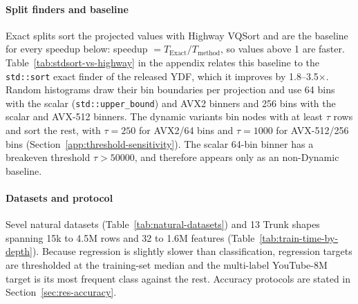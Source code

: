 \documentclass[sigconf]{acmart}%
\begin{document}
\paragraph{Split finders and baseline} Exact splits sort the projected values with Highway VQSort and are the baseline for every speedup below: speedup $= T_{\mathrm{Exact}}/T_{\mathrm{method}}$, so values above 1 are faster. Table~\ref{tab:stdsort-vs-highway} in the appendix relates this baseline to the \texttt{std::sort} exact finder of the released YDF, which it improves by 1.8--3.5$\times$. Random histograms draw their bin boundaries per projection and use 64 bins with the scalar (\texttt{std::upper\_bound}) and AVX2 binners and 256 bins with the scalar and AVX-512 binners. The dynamic variants bin nodes with at least $\tau$ rows and sort the rest, with $\tau=250$ for AVX2/64 bins and $\tau=1000$ for AVX-512/256 bins (Section~\ref{app:threshold-sensitivity}). The scalar 64-bin binner has a breakeven threshold $\tau>50000$, and therefore appears only as an non-Dynamic baseline.

\paragraph{Datasets and protocol} Sevel natural datasets (Table~\ref{tab:natural-datasets}) and 13 Trunk shapes spanning 15k to 4.5M rows and 32 to 1.6M features (Table~\ref{tab:train-time-by-depth}). Because regression is slightly slower than classification, regression targets are thresholded at the training-set median and the multi-label YouTube-8M target is its most frequent class against the rest. 
Accuracy protocols are stated in Section~\ref{sec:res-accuracy}.



\end{document}
